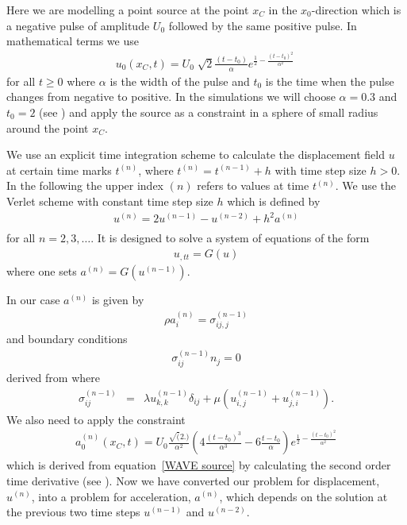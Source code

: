 Here we are modelling a point source at the point $x_C$ in the
$x_{0}$-direction which is a negative pulse of amplitude
$U_{0}$ followed by the same positive pulse.
In mathematical terms we use
\begin{eqnarray} \label{WAVE source}
u_{0}(x_C,t)= U_{0} \; \sqrt{2}  \frac{(t-t_{0})}{\alpha} e^{\frac{1}{2}-\frac{(t-t_{0})^2}{\alpha^2}} \ 
\end{eqnarray}
for all $t\ge0$ where $\alpha$ is the width of the pulse and $t_{0}$
is the time when the pulse changes from negative to positive.
In the simulations we will choose $\alpha=0.3$ and $t_{0}=2$ (see
\fig{WAVE FIG 1.2}) and apply the source as a constraint in a sphere of small
radius around the point $x_C$.  

We use an explicit time integration scheme to calculate the displacement field
$u$ at certain time marks $t^{(n)}$, where $t^{(n)}=t^{(n-1)}+h$ with time
step size $h>0$.
In the following the upper index ${(n)}$ refers to values at time $t^{(n)}$.
We use the Verlet scheme\index{Verlet scheme} with constant time step size $h$
which is defined by
\begin{eqnarray} \label{WAVE dyn 2}
u^{(n)}=2u^{(n-1)}-u^{(n-2)} + h^2 a^{(n)} \\
\end{eqnarray}
for all $n=2,3,\ldots$. It is designed to solve a system of equations of the form
\begin{eqnarray} \label{WAVE dyn 2b} 
u_{,tt}=G(u)
\end{eqnarray}
where one sets $a^{(n)}=G(u^{(n-1)})$.

In our case $a^{(n)}$ is given by
\begin{eqnarray}\label{WAVE dyn 3}
\rho a^{(n)}_{i}=\sigma^{(n-1)}_{ij,j}
\end{eqnarray}
and boundary conditions
\begin{eqnarray} \label{WAVE natural at n}
\sigma^{(n-1)}_{ij}n_{j}=0
\end{eqnarray}
derived from  where 
\begin{eqnarray} \label{WAVE dyn 3a}
\sigma_{ij}^{(n-1)} & = & \lambda u^{(n-1)}_{k,k} \delta_{ij} + \mu ( u^{(n-1)}_{i,j} + u^{(n-1)}_{j,i}).
\end{eqnarray}
We also need to apply the constraint 
\begin{eqnarray} \label{WAVE dyn 3aa}
a^{(n)}_{0}(x_C,t)= U_{0} 
\frac{\sqrt(2.)}{\alpha^2} (4\frac{(t-t_{0})^3}{\alpha^3}-6\frac{t-t_{0}}{\alpha})e^{\frac{1}{2}-\frac{(t-t_{0})^2}{\alpha^2}}
\end{eqnarray}
which is derived from equation~\ref{WAVE source} by calculating the second
order time derivative (see \fig{WAVE FIG 1.1}).
Now we have converted our problem for displacement, $u^{(n)}$, into a problem
for acceleration, $a^{(n)}$, which depends on the solution at the previous two
time steps $u^{(n-1)}$ and $u^{(n-2)}$.

